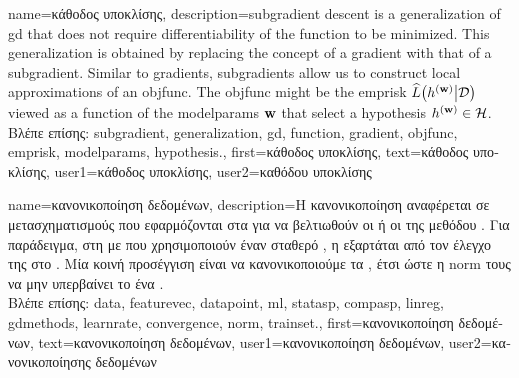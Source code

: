 {name={\foreignlanguage{greek}{κάθοδος υποκλίσης}}, 
	description={\Gls{subgradient} 
		descent is a \gls{generalization} of \gls{gd} that does not require differentiability of the 
		\gls{function} to be minimized. This \gls{generalization} is obtained by replacing the concept 
		of a \gls{gradient} with that of a \gls{subgradient}. Similar to \gls{gradient}s, \gls{subgradient}s 
		allow us to construct local approximations of an \gls{objfunc}. The \gls{objfunc} 
		might be the \gls{emprisk} $\widehat{L}\big( h^{({\bf w})} \big| \mathcal{D} \big)$ viewed 
		as a \gls{function} of the \gls{modelparams} ${\bf w}$ that select a \gls{hypothesis} $h^{({\bf w})} \in \mathcal{H}$.\\
		\foreignlanguage{greek}{Βλέπε επίσης:} \gls{subgradient}, \gls{generalization}, \gls{gd}, \gls{function}, \gls{gradient}, 
		\gls{objfunc}, \gls{emprisk}, \gls{modelparams}, \gls{hypothesis}.},
	first={\foreignlanguage{greek}{κάθοδος υποκλίσης}},
	text={\foreignlanguage{greek}{κάθοδος υποκλίσης}},
	user1={\foreignlanguage{greek}{κάθοδος υποκλίσης}}, %
	user2={\foreignlanguage{greek}{καθόδου υποκλίσης}} %
}

{name={\foreignlanguage{greek}{κανονικοποίηση δεδομένων}},
	description={\foreignlanguage{greek}{Η κανονικοποίηση}  
		\foreignlanguage{greek}{αναφέρεται σε μετασχηματισμούς που εφαρμόζονται στα}   
		\foreignlanguage{greek}{για να βελτιωθούν οι}  \foreignlanguage{greek}{ή οι}  
		\foreignlanguage{greek}{της μεθόδου} . \foreignlanguage{greek}{Για παράδειγμα, στη}  
		\foreignlanguage{greek}{με}  \foreignlanguage{greek}{που χρησιμοποιούν έναν σταθερό}
		, \foreignlanguage{greek}{η}  \foreignlanguage{greek}{εξαρτάται από τον έλεγχο της} 
		  \foreignlanguage{greek}{στο} . \foreignlanguage{greek}{Μία κοινή 
		προσέγγιση είναι να κανονικοποιούμε τα} , \foreignlanguage{greek}{έτσι ώστε η} 
		\gls{norm} \foreignlanguage{greek}{τους να μην υπερβαίνει το ένα} \cite[\foreignlanguage{greek}{Κεφ.}\ 5]{MLBasics}.\\
		\foreignlanguage{greek}{Βλέπε επίσης:} \gls{data}, \gls{featurevec}, \gls{datapoint}, \gls{ml}, \gls{statasp}, \gls{compasp}, 
		\gls{linreg}, \gls{gdmethods}, \gls{learnrate}, \gls{convergence}, \gls{norm}, \gls{trainset}.},
	first={\foreignlanguage{greek}{κανονικοποίηση δεδομένων}},
	text={\foreignlanguage{greek}{κανονικοποίηση δεδομένων}},
	user1={\foreignlanguage{greek}{κανονικοποίηση δεδομένων}}, %
  	user2={\foreignlanguage{greek}{κανονικοποίησης δεδομένων}} %
}

